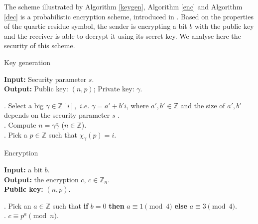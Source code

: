 \documentclass[11pt, a4paper, twoside, openright]{report}
\begin{document}
	The scheme illustrated by Algorithm \ref{keygen}, Algorithm \ref{enc} and Algorithm \ref{dec} is a probabilistic
	encryption scheme, introduced in \cite{p}.
    Based on the properties of the quartic residue 
	symbol, the sender is encrypting a bit $b$ with the public key and 
	the receiver is able to decrypt it using its secret key. We analyse here the security of this scheme.

	
	
	\begin{algorithm}
	\caption{Key generation}
	\label{keygen}
	\begin{algorithmic}
	 \STATE \textbf{Input:} Security parameter $s$. \\
	 \textbf{Output:} Public key: $(n, p)$;  Private key: $\gamma$.
	 
	\bigskip
	 
	\STATE	{}. Select a big $\gamma \in \mathbb{Z}[i],$ $i.e.$ $\gamma = a' + b'i$, where $a', b' \in \mathbb{Z}$ and
	the size of $a', b'$ depends on the security parameter $s$ . \\
	\STATE {}. Compute $n =\gamma \bar{\gamma}$ ($n \in \mathbb{Z}$). \\
	\STATE {}. Pick a $p \in \mathbb{Z}$ such that  $ \chi_{\gamma} (p) = i $. \\
	\end{algorithmic}
	\end{algorithm}
	
	
    \begin{algorithm}
	\caption{Encryption}
	\label{enc}
	\begin{algorithmic}
	\STATE \textbf{Input:} a bit $b$. \\
		 \textbf{Output:} the encryption $c$, $c  \in \mathbb{Z}_n$.  \\
		 \textbf{Public key:} $(n,p)$.
		 
		 
	\bigskip
		 
	\STATE
	. Pick an $a \in \mathbb{Z}$ such that \textbf{if} $b =0$ \textbf{then} $a \equiv 1 \pmod{4}$
	\textbf{else}  $a \equiv 3 \pmod{4}$. \\
    . $c \equiv p^a \pmod{n}$. \\ 
	\end{algorithmic}
	\end{algorithm}
	
	
	
\end{document}
